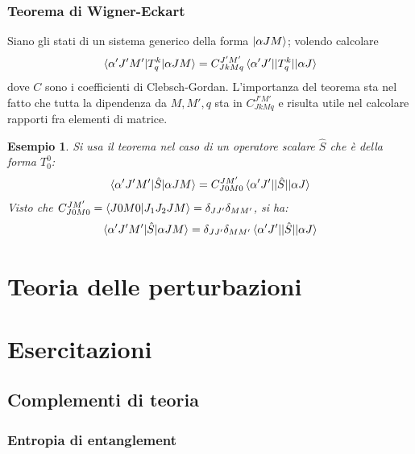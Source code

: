 \documentclass[11pt, a4paper]{scrartcl} %
\numberwithin{equation}{subsection}
\theoremstyle{style2}
\theoremstyle{style1}
\newtheorem{esempio}{Esempio}[section]
\begin{document}
\subsubsection{Teorema di Wigner-Eckart}
Siano gli stati di un sistema generico della forma $\ket{\alpha J M } $; volendo calcolare
\[
\braket{\alpha 'J'M'|T^k_q|\alpha JM} =C^{J'M'}_{JkMq} \braket{\alpha ' J'||T^k_q||\alpha J} 
\] 
dove $C$ sono i coefficienti di Clebsch-Gordan. 
L'importanza del teorema sta nel fatto che tutta la dipendenza da $M,M',q$ sta in $C^{J'M'} _{JkMq} $ e risulta utile nel calcolare rapporti fra elementi di matrice.

\begin{esempio}
	Si usa il teorema nel caso di un operatore scalare $\hat{S}$ che \`e della forma $T^0_0$:
	\[
		\braket{\alpha ' J'M'|\hat{S}|\alpha JM} = C^{JM'} _{J0M0}  \braket{\alpha 'J'||\hat{S} ||\alpha J} 
	\] 
	Visto che $C^{JM'} _{J0M0}=\braket{J 0 M 0|J_1J_2 J M} = \delta _{JJ'}\delta _{MM'}  $, si ha:
	\[
	\braket{\alpha ' J'M'|\hat{S}|\alpha JM} = \delta _{JJ'} \delta_{ MM'} \braket{\alpha 'J'||\hat{S}||\alpha J} 
	\] 
\end{esempio}

\newpage
\section{Teoria delle perturbazioni}






















\newpage
\section{Esercitazioni}
\subsection{Complementi di teoria}

\subsubsection{Entropia di entanglement}
\end{document}

